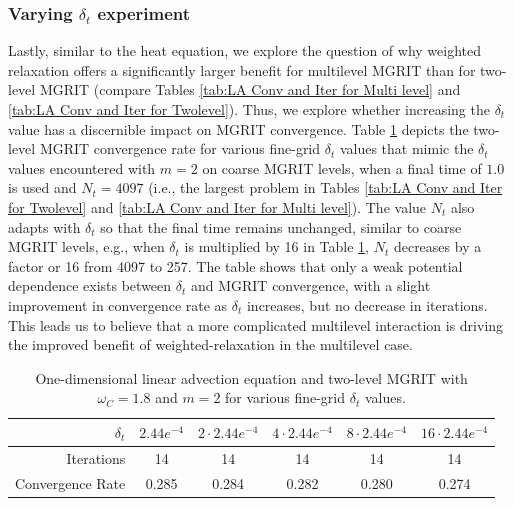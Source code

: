 \documentclass[VANCOUVER,STIX1COL]{WileyNJD-v2}
\begin{document}
\subsubsection{Varying $\delta_t$ experiment}
\label{sec:vary_dt_LA}
Lastly, similar to the heat equation, we explore the question of why weighted relaxation offers a significantly
larger benefit for multilevel MGRIT than for two-level MGRIT (compare Tables 
\ref{tab:LA Conv and Iter for Multi level} and \ref{tab:LA Conv and Iter for Twolevel}).  Thus, we explore 
whether increasing the $\delta_t$ value has a discernible impact on MGRIT convergence.  Table 
\ref{tab:LA_vary_dt} depicts the two-level MGRIT convergence rate for various fine-grid $\delta_t$ values
that mimic the $\delta_t$ values encountered with $m=2$ on coarse MGRIT levels, when a final time of $1.0$ is used and $N_t = 4097$ (i.e., the largest problem in Tables \ref{tab:LA Conv and Iter for Twolevel} and \ref{tab:LA Conv and Iter for Multi level}).  The value
$N_t$ also adapts with $\delta_t$ so that the final time remains unchanged, similar to coarse MGRIT levels, e.g., when $\delta_t$ is 
multiplied by 16 in Table \ref{tab:LA_vary_dt}, $N_t$ decreases by a factor or 16 from 4097 to 257.  The 
table shows that only a weak potential dependence exists between $\delta_t$ and MGRIT convergence, with a slight
improvement in convergence rate as $\delta_t$ increases, but no decrease in iterations.  This leads us to 
believe that a more complicated multilevel interaction is driving the improved benefit of weighted-relaxation 
in the multilevel case.

\begin{table}[h!]
\centering
\begin{tabular}{r | c|c|c|c|c}
     $\delta_t$         & $2.44e^{-4}$ & $2 \cdot 2.44e^{-4}$ & $4 \cdot 2.44e^{-4}$ & $8 \cdot 2.44e^{-4}$ & $16 \cdot 2.44e^{-4}$ \\  \toprule        
     Iterations         & 14    & 14    & 14    & 14    &  14    \\
     Convergence Rate   & 0.285 & 0.284 & 0.282 & 0.280 & 0.274
\end{tabular}
\caption{One-dimensional linear advection equation and two-level MGRIT with $\omega_{C}=1.8$ and $m=2$ for various fine-grid $\delta_t$ values.}
\label{tab:LA_vary_dt}
\end{table}
\end{document}
